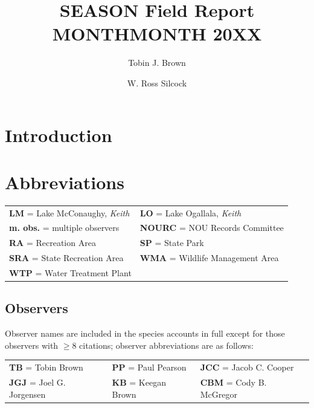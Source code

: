 \documentclass[OA]{fieldreport}
\begin{document}
	
	
	\title{SEASON Field Report \\ MONTH\textendash MONTH 20XX}
	
	\author[1]{Tobin J. Brown}
	\author[2]{W. Ross Silcock}
	
	
	\maketitle
	
	\section*{Introduction}
	
	\lipsum[1]
	
	\section*{Abbreviations}
	
	\begin{tabular}{l l}
		\textbf{LM} = Lake McConaughy, \textit{Keith} &
		\textbf{LO} = Lake Ogallala, \textit{Keith} \\
		\textbf{m. obs.} = multiple observers &
		\textbf{NOURC} = NOU Records Committee \\
		\textbf{RA} = Recreation Area &
		\textbf{SP} = State Park \\
		\textbf{SRA} = State Recreation Area &
		\textbf{WMA} = Wildlife Management Area \\
		\textbf{WTP} = Water Treatment Plant &
	\end{tabular}
	
	\subsection*{Observers}
	
	Observer names are included in the species accounts in full except for those observers with $\ge 8$ citations; observer abbreviations are as follows:
	
	\begin{tabular}{l l l}
		\textbf{TB} = Tobin Brown & \textbf{PP} = Paul Pearson & \textbf{JCC} = Jacob C. Cooper \\
		\textbf{JGJ} = Joel G. Jorgensen & \textbf{KB} = Keegan Brown & \textbf{CBM} = Cody B. McGregor \\
	\end{tabular}
	
\end{document}
